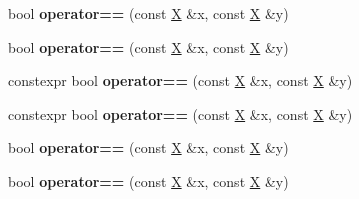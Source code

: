 \begin{DoxyCompactItemize}
bool {\bfseries operator==} (const \mbox{\hyperlink{class_x}{X}} \&x, const \mbox{\hyperlink{class_x}{X}} \&y)
\item 
\mbox{\label{class_x_a1651e729cc70ea9942f074061b09216a}} 
bool {\bfseries operator==} (const \mbox{\hyperlink{class_x}{X}} \&x, const \mbox{\hyperlink{class_x}{X}} \&y)
\item 
\mbox{\label{class_x_a9d441e76e2ab7afd90f64e49f2809fc7}} 
constexpr bool {\bfseries operator==} (const \mbox{\hyperlink{class_x}{X}} \&x, const \mbox{\hyperlink{class_x}{X}} \&y)
\item 
\mbox{\label{class_x_a9d441e76e2ab7afd90f64e49f2809fc7}} 
constexpr bool {\bfseries operator==} (const \mbox{\hyperlink{class_x}{X}} \&x, const \mbox{\hyperlink{class_x}{X}} \&y)
\item 
\mbox{\label{class_x_a1651e729cc70ea9942f074061b09216a}} 
bool {\bfseries operator==} (const \mbox{\hyperlink{class_x}{X}} \&x, const \mbox{\hyperlink{class_x}{X}} \&y)
\item 
\mbox{\label{class_x_a1651e729cc70ea9942f074061b09216a}} 
bool {\bfseries operator==} (const \mbox{\hyperlink{class_x}{X}} \&x, const \mbox{\hyperlink{class_x}{X}} \&y)
\end{DoxyCompactItemize}


